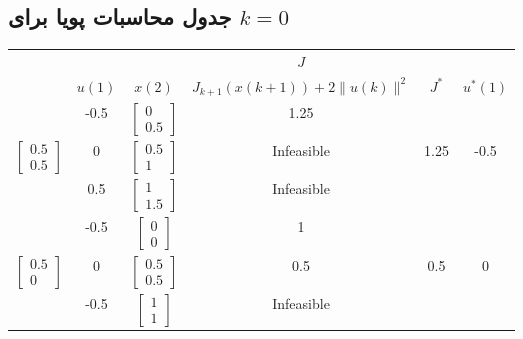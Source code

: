 \documentclass[14pt, a4paper]{extarticle}
\begin{document}
	\subsection*{جدول محاسبات پویا برای \( k = 0 \)}
	\begin{latin}
		\begin{longtable}{|c|c|c|c|c|c|}
			\hline
			\rowcolor[HTML]{00D2CB} 
			& 	 & 	 & $J$ &	 &	\\
			\rowcolor[HTML]{00D2CB} 
			\multirow{-2}{*}{$x(1)$}	&\multirow{-2}{*}{$u(1)$ }	&\multirow{-2}{*}{$x(2)$}	& $J_{k+1}(x(k+1)) + 2\|u(k)\|^2$ &\multirow{-2}{*}{$J^*$}	& \multirow{-2}{*}{$u^*(1)$}\\ \hline
			\endfirsthead                                             
			\endhead
			&-0.5&$\begin{bmatrix} 0 \\ 0.5 \end{bmatrix}$&1.25&	&	\\  \cline{2-4} 
			\multirow{-3}{*}{$\begin{bmatrix} 0.5 \\ 0.5 \end{bmatrix}$}&0&$\begin{bmatrix} 0.5 \\ 1 \end{bmatrix}$&Infeasible&1.25&-0.5	\\  \cline{2-4} 		
			&0.5&$\begin{bmatrix} 1 \\ 1.5 \end{bmatrix}$&Infeasible&	&	\\  \cline{2-4} \hline
			
			&      -0.5                  &$\begin{bmatrix} 0 \\ 0 \end{bmatrix}$      &    1 &             &   \\  \cline{2-4} 
			\multirow{-3}{*}{$\begin{bmatrix} 0.5 \\ 0 \end{bmatrix}$}&        0                &$\begin{bmatrix} 0.5 \\ 0.5 \end{bmatrix}$      &      0.5                  &    0.5     &  $0$   \\  \cline{2-4} 
			&         -0.5               &$\begin{bmatrix} 1 \\ 1 \end{bmatrix}$      & Infeasible                        &              &   \\  \cline{2-4} \hline
			

\end{longtable}
\end{latin}
\end{document}
